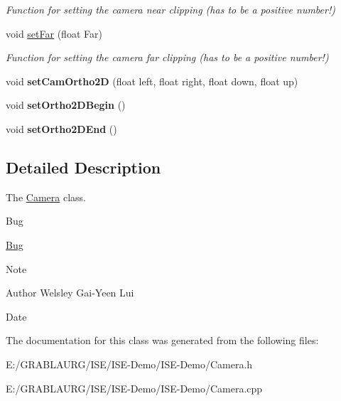 \begin{DoxyCompactItemize}
\begin{DoxyCompactList}\small\item\em Function for setting the camera near clipping (has to be a positive number!) \end{DoxyCompactList}\item 
\hypertarget{class_camera_a329cba7e3a6eeba957c9751007fc675e}{void \hyperlink{class_camera_a329cba7e3a6eeba957c9751007fc675e}{set\-Far} (float Far)}\label{class_camera_a329cba7e3a6eeba957c9751007fc675e}

\begin{DoxyCompactList}\small\item\em Function for setting the camera far clipping (has to be a positive number!) \end{DoxyCompactList}\item 
\hypertarget{class_camera_add35feeba6d994afcd9c3ed6d6a25929}{void {\bfseries set\-Cam\-Ortho2\-D} (float left, float right, float down, float up)}\label{class_camera_add35feeba6d994afcd9c3ed6d6a25929}

\item 
\hypertarget{class_camera_ade08194ea0d5b01fe913d6d22b78fa4a}{void {\bfseries set\-Ortho2\-D\-Begin} ()}\label{class_camera_ade08194ea0d5b01fe913d6d22b78fa4a}

\item 
\hypertarget{class_camera_a41a854c5eccc8b2f8463e2ffbb5b628e}{void {\bfseries set\-Ortho2\-D\-End} ()}\label{class_camera_a41a854c5eccc8b2f8463e2ffbb5b628e}

\end{DoxyCompactItemize}


\subsection{Detailed Description}
The \hyperlink{class_camera}{Camera} class. 

\begin{DoxyRefDesc}{Bug}
\item[\hyperlink{bug__bug000002}{Bug}]\begin{DoxyNote}{Note}

\end{DoxyNote}
\begin{DoxyAuthor}{Author}
Welsley Gai-\/\-Yeen Lui 
\end{DoxyAuthor}
\begin{DoxyDate}{Date}

\end{DoxyDate}
\end{DoxyRefDesc}


The documentation for this class was generated from the following files\-:\begin{DoxyCompactItemize}
\item 
E\-:/\-G\-R\-A\-B\-L\-A\-U\-R\-G/\-I\-S\-E/\-I\-S\-E-\/\-Demo/\-I\-S\-E-\/\-Demo/Camera.\-h\item 
E\-:/\-G\-R\-A\-B\-L\-A\-U\-R\-G/\-I\-S\-E/\-I\-S\-E-\/\-Demo/\-I\-S\-E-\/\-Demo/Camera.\-cpp\end{DoxyCompactItemize}
